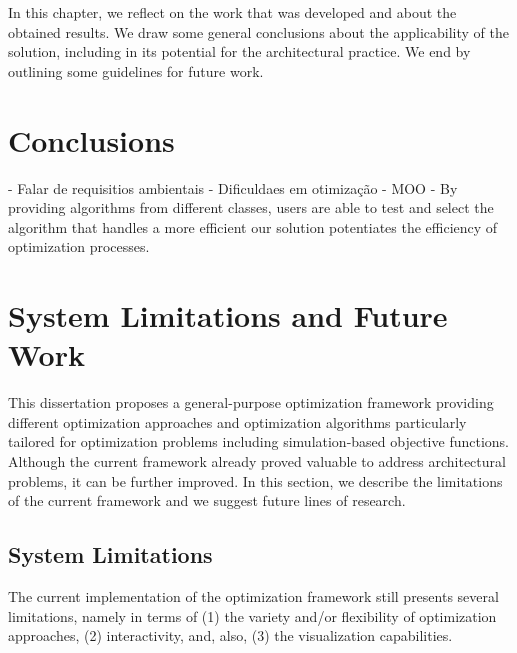 \label{chap:conclusion}

In this chapter, we reflect on the work that was developed and about the obtained results. We draw some general conclusions about the applicability of the solution, including in its potential for the architectural practice. We end by outlining some guidelines for future work. 

\section{Conclusions}

- Falar de requisitios ambientais
- Dificuldaes em otimização 
- MOO
- 
By providing algorithms from different classes, users are able to test and select the algorithm that handles a more efficient 
our solution potentiates the efficiency of optimization processes. 



\section{System Limitations and Future Work}

This dissertation proposes a general-purpose optimization framework providing different optimization approaches and optimization algorithms particularly tailored for optimization problems including simulation-based objective functions. Although the current framework already proved valuable to address architectural problems, it can be further improved. In this section, we describe the limitations of the current framework and we suggest future lines of research.

\subsection{System Limitations}

The current implementation of the optimization framework still presents several limitations, namely in terms of (1) the variety and/or flexibility of optimization approaches, (2) interactivity, and, also, (3) the visualization capabilities.

